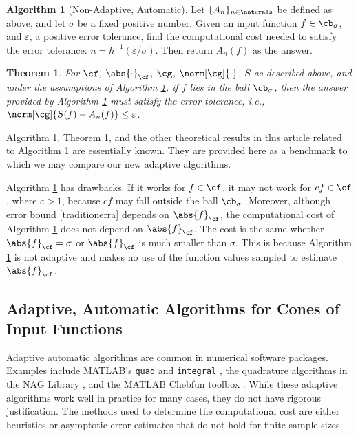 \documentclass[]{elsarticle}
\newtheorem{theorem}{Theorem}
\theoremstyle{definition}
\newtheorem{algo}{Algorithm}
\theoremstyle{remark}
\newcommand{\Fnorm}[1]{\abs{#1}_{\cf}}
\newcommand{\Gnorm}[1]{\norm[\cg]{#1}}
\begin{document}
\begin{algo}[Non-Adaptive, Automatic] \label{nonadaptalgo} Let $\{A_n\}_{n \in \naturals}$ be defined as above, and let $\sigma$ be a fixed positive number.  Given an input function $f\in \cb_{\sigma}$, and $\varepsilon$, a positive error tolerance, find the computational cost needed to satisfy the error tolerance: $n=h^{-1}(\varepsilon/\sigma)$.  Then return $A_n(f)$ as the answer.
\end{algo}

\begin{theorem}  \label{NonAdaptDetermThm}  For $\cf$, $\Fnorm{\cdot}$, $\cg$, $\Gnorm{\cdot}$, $S$ as described above, and under the assumptions of Algorithm \ref{nonadaptalgo}, if $f$ lies in the ball $\cb_\sigma$, then the answer provided by Algorithm \ref{nonadaptalgo} must satisfy the error tolerance, i.e., $\norm[\cg]{S(f)-A_n(f)} \le \varepsilon$.
\end{theorem}

Algorithm \ref{nonadaptalgo}, Theorem \ref{NonAdaptDetermThm}, and the other theoretical results in this article related to Algorithm \ref{nonadaptalgo} are essentially known.  They are provided here as a benchmark to which we may compare our new adaptive algorithms.  

Algorithm \ref{nonadaptalgo} has drawbacks.  If it works for $f \in \cf$, it may not work for $cf \in \cf$, where $c>1$, because $cf$ may fall outside the ball $\cb_\sigma$.  Moreover, although error bound \eqref{traditionerra} depends on $\Fnorm{f}$, the computational cost of Algorithm \ref{nonadaptalgo} does not depend on $\Fnorm{f}$.  The cost is the same whether $\Fnorm{f}=\sigma$ or $\Fnorm{f}$ is much smaller than $\sigma$.  This is because Algorithm \ref{nonadaptalgo} is not adaptive and makes no use of the function values sampled to estimate $\Fnorm{f}$.

\subsection{Adaptive, Automatic Algorithms for Cones of Input Functions} \label{adapintrosec}

Adaptive automatic algorithms are common in numerical software packages.  Examples include  MATLAB's {\tt quad} and {\tt integral} \cite{MAT8.1}, the quadrature algorithms in the NAG Library \cite{NAG23}, and the MATLAB Chebfun toolbox \cite{TrefEtal12}.  While these adaptive algorithms work well in practice for many cases, they do not have rigorous justification. The methods used to determine the computational cost are either heuristics or asymptotic error estimates that do not hold for finite sample sizes.
\end{document}
